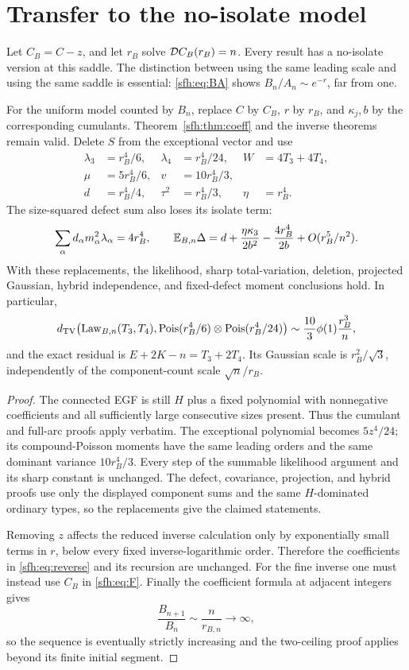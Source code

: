 \section{Transfer to the no-isolate model}\label{sfh:sec:transfer}
Let $C_B=C-z$, and let $r_B$ solve $\mathcal D C_B(r_B)=n$. Every result has a no-isolate version at this saddle. The distinction between using the same leading scale and using the same saddle is essential: \eqref{sfh:eq:BA} shows $B_n/A_n\sim e^{-r}$, far from one.

\begin{theorem}\label{sfh:thm:B}
For the uniform model counted by $B_n$, replace $C$ by $C_B$, $r$ by $r_B$, and $\kappa_j,b$ by the corresponding cumulants. Theorem~\ref{sfh:thm:coeff} and the inverse theorems remain valid. Delete $S$ from the exceptional vector and use
\begin{align*}
 \lambda_3&=r_B^4/6,&\lambda_4&=r_B^4/24,& W&=4T_3+4T_4,\\
 \mu&=5r_B^4/6,& v&=10r_B^4/3,\\
 d&=r_B^4/4,&\tau^2&=r_B^4/3,&\eta&=r_B^4.
\end{align*}
The size-squared defect sum also loses its isolate term:
\[
 \sum_\alpha d_\alpha m_\alpha^2\lambda_\alpha=4r_B^4,
 \qquad
 \mathbb E_{B,n}\Delta=d+\frac{\eta\kappa_3}{2b^2}
                  -\frac{4r_B^4}{2b}+O(r_B^5/n^2).
\]
With these replacements, the likelihood, sharp total-variation, deletion, projected Gaussian, hybrid independence, and fixed-defect moment conclusions hold. In particular,
\[
 d_{\mathrm{TV}}\!\left(\operatorname{Law}_{B,n}(T_3,T_4),
       \operatorname{Pois}(r_B^4/6)\otimes\operatorname{Pois}(r_B^4/24)\right)
 \sim\frac{10}{3}\phi(1)\frac{r_B^3}{n},
\]
and the exact residual is $E+2K-n=T_3+2T_4$. Its Gaussian scale is $r_B^2/\sqrt3$, independently of the component-count scale $\sqrt n/r_B$.
\end{theorem}
\begin{proof}
The connected EGF is still $H$ plus a fixed polynomial with nonnegative coefficients and all sufficiently large consecutive sizes present. Thus the cumulant and full-arc proofs apply verbatim. The exceptional polynomial becomes $5z^4/24$; its compound-Poisson moments have the same leading orders and the same dominant variance $10r_B^4/3$. Every step of the summable likelihood argument and its sharp constant is unchanged. The defect, covariance, projection, and hybrid proofs use only the displayed component sums and the same $H$-dominated ordinary types, so the replacements give the claimed statements.

Removing $z$ affects the reduced inverse calculation only by exponentially small terms in $r$, below every fixed inverse-logarithmic order. Therefore the coefficients in \eqref{sfh:eq:reverse} and its recursion are unchanged. For the fine inverse one must instead use $C_B$ in \eqref{sfh:eq:F}. Finally the coefficient formula at adjacent integers gives
\[
 \frac{B_{n+1}}{B_n}\sim\frac{n}{r_{B,n}}\longrightarrow\infty,
\]
so the sequence is eventually strictly increasing and the two-ceiling proof applies beyond its finite initial segment.
\end{proof}
